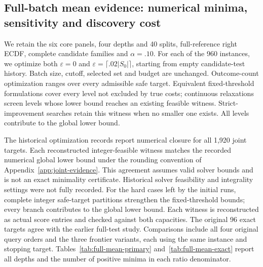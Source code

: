 \subsection{Full-batch mean evidence: numerical minima, sensitivity and discovery cost}
\label{app:full-mean-grid}
We retain the six core panels, four depths and 40 splits, full-reference right ECDF, complete candidate families and $\alpha=.10$. For each of the 960 instances, we optimize both $\varepsilon=0$ and $\varepsilon=\lceil.02|S_0|\rceil$, starting from empty candidate-test history. Batch size, cutoff, selected set and budget are unchanged. Outcome-count optimization ranges over every admissible safe target. Equivalent fixed-threshold formulations cover every level not excluded by true costs; continuous relaxations screen levels whose lower bound reaches an existing feasible witness. Strict-improvement searches retain this witness when no smaller one exists. All levels contribute to the global lower bound.

The historical optimization records report numerical closure for all 1,920 joint targets. Each reconstructed integer-feasible witness matches the recorded numerical global lower bound under the rounding convention of Appendix~\ref{app:joint-evidence}. This agreement assumes valid solver bounds and is not an exact minimality certificate. Historical solver feasibility and integrality settings were not fully recorded. For the hard cases left by the initial runs, complete integer safe-target partitions strengthen the fixed-threshold bounds; every branch contributes to the global lower bound. Each witness is reconstructed as actual score entries and checked against both capacities. The original 96 exact targets agree with the earlier full-test study. Comparisons include all four original query orders and the three frontier variants, each using the same instance and stopping target. Tables~\ref{tab:full-mean-primary} and~\ref{tab:full-mean-exact} report all depths and the number of positive minima in each ratio denominator.

